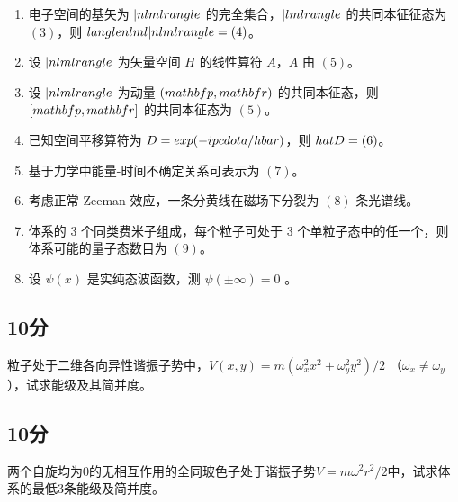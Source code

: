 \begin{enumerate}
    \item 电子空间的基矢为 $| n l m l \\rangle$ 的完全集合，$| l m l \\rangle$ 的共同本征征态为 $(3)$，则 $\\langle n l m l | n l m l \\rangle = (4)$。
    
    \item 设 $| n l m l \\rangle$ 为矢量空间 $H$ 的线性算符 $A$，$A$ 由 $(5)$。
    
    \item 设 $| n l m l \\rangle$ 为动量 $(\\mathbf{p}, \\mathbf{r})$ 的共同本征态，则 $[\\mathbf{p}, \\mathbf{r}]$ 的共同本征态为 $(5)$。
    
    \item 已知空间平移算符为 $D = \\exp(-ip \\cdot a/\\hbar)$，则 $\\hat D = (6)$。
    
    \item 基于力学中能量-时间不确定关系可表示为 $(7)$。
    
    \item 考虑正常 Zeeman 效应，一条分黄线在磁场下分裂为 $(8)$ 条光谱线。
    
    \item 体系的 3 个同类费米子组成，每个粒子可处于 3 个单粒子态中的任一个，则体系可能的量子态数目为 $(9)$。
    
    \item 设 $\psi(x)$ 是实纯态波函数，测 $\psi(\pm\infty) = 0$ 。
\end{enumerate}

\subsection{10分}
粒子处于二维各向异性谐振子势中，$V(x, y) = m(\omega_x^2 x^2 + \omega_y^2 y^2)/2$ （$\omega_x \neq \omega_y$），试求能级及其简并度。
\subsection{10分}
两个自旋均为0的无相互作用的全同玻色子处于谐振子势$V = m\omega^2 r^2 / 2$中，试求体系的最低3条能级及简并度。
